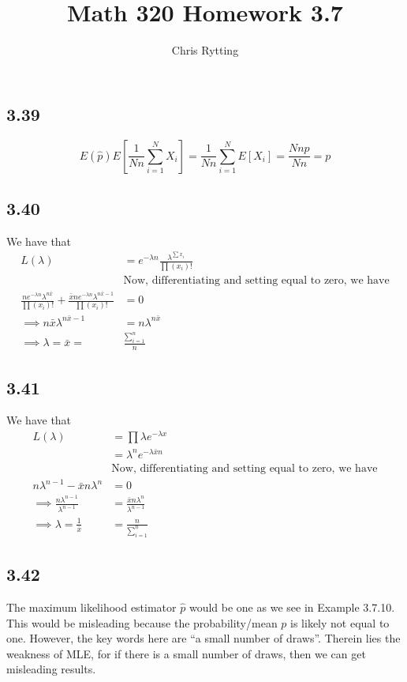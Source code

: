 \documentclass[letterpaper,12pt]{article}
\theoremstyle{definition}
\begin{document}
\title{Math 320 Homework 3.7}
\author{Chris Rytting}
\maketitle

\subsection*{3.39}
\[E(\hat p) E \left[ \frac{1}{Nn} \sum^{N}_{i=1} X_i \right]  = \frac{1}{Nn} \sum^{N}_{i=1} E[X_i] = \frac{Nnp}{Nn} = p\]

\subsection*{3.40}
We have that
\begin{align*}
    L(\lambda) & = e^{-\lambda n}\frac{\lambda^{\sum x_i}}{\prod (x_i)!} \\
   &\text{Now, differentiating and setting equal to zero, we have}\\
    \frac{ne^{-\lambda n}\lambda^{ n \bar x}}{\prod (x_i)!} + \frac{\bar x ne^{-\lambda n}\lambda^{n \bar x -1}}{\prod (x_i)!} &= 0 \\
    \implies n \bar x \lambda ^{n \bar x-1} &=n \lambda^{n \bar x}\\
    \implies \lambda = \bar x = &\frac{\sum_{i=1}^n}{n}
\end{align*}

\subsection*{3.41}
We have that
\begin{align*}
    L(\lambda) &= \prod \lambda e^{-\lambda x} \\
    & = \lambda^n e^{-\lambda \bar x n}\\
    &\text{Now, differentiating and setting equal to zero, we have} \\
    n \lambda ^{n-1} - \bar xn \lambda^n &= 0 \\
    \implies   \frac{n\lambda^{n-1}}{\lambda^{n-1}} &= \frac{\bar x n \lambda ^n}{\lambda^{n-1}} \\
    \implies   \lambda = \frac{1}{\bar x} &= \frac{n}{\sum ^n _{i=1}}
\end{align*}




\subsection*{3.42}
The maximum likelihood estimator $ \hat p$ would be one as we see in Example 3.7.10. This would be misleading because the probability/mean $p$ is likely not equal to one. However, the key words here are ``a small number of draws''. Therein lies the weakness of MLE, for if there is a small number of draws, then we can get misleading results. 
\end{document}
